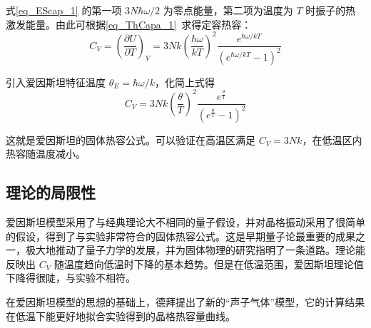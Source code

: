 式\autoref{eq_EScap_1} 的第一项 $3N \hbar\omega/2$ 为零点能量，第二项为温度为 $T$ 时振子的热激发能量。由此可根据\autoref{eq_ThCapa_1}~求得定容热容：
\begin{equation}
C_V=\left(\frac{\partial U}{\partial T}\right)_V=3Nk\left(\frac{\hbar \omega}{kT}\right)^2\frac{e^{\hbar \omega/kT}}{(e^{\hbar \omega/kT}-1)^2}
\end{equation}

引入爱因斯坦特征温度 $\theta_E=\hbar\omega/k$，化简上式得
\begin{equation}\label{eq_EScap_2}
C_V=3Nk\left(\frac{\theta}{T}\right)^2\frac{e^{\frac{\theta}{T}}}{(e^{\frac{\theta}{T}}-1)^2}
\end{equation}

这就是爱因斯坦的固体热容公式。可以验证在高温区满足 $C_V=3Nk$，在低温区内热容随温度减小。

\subsection{理论的局限性}
爱因斯坦模型采用了与经典理论大不相同的量子假设，并对晶格振动采用了很简单的假设，得到了与实验非常符合的固体热容公式。这是早期量子论最重要的成果之一，极大地推动了量子力学的发展，并为固体物理的研究指明了一条道路。理论能反映出 $C_V$ 随温度趋向低温时下降的基本趋势。但是在低温范围，爱因斯坦理论值下降得很陡，与实验不相符。

在爱因斯坦模型的思想的基础上，德拜提出了新的“声子气体”模型，它的计算结果在低温下能更好地拟合实验得到的晶格热容量曲线。